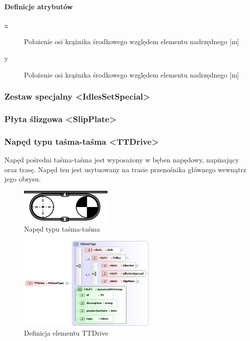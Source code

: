 \documentclass[12pt,a4paper]{article}
\begin{document}
\paragraph{Definicje atrybutów}
\begin{description}
\item[x] Położenie osi krążnika środkowego względem elementu nadrzędnego [m]
\item[y] Położenie osi krążnika środkowego względem elementu nadrzędnego [m]
\end{description}


\subsubsection{Zestaw specjalny <IdlesSetSpecial>}


\subsubsection{Płyta ślizgowa <SlipPlate>}


\subsubsection{Napęd typu taśma-taśma <TTDrive>}
Napęd pośredni taśma-taśma jest wyposażony w bęben napędowy, napinający oraz
trasę. Napęd ten jest usytuowany na trasie przenośnika głównego wewnątrz jego
obrysu.

\begin{figure}[H]
  \centering
  \includegraphics[width=0.4\textwidth]{png/naped_tt}
  \caption{Napęd typu taśma-taśma}
  \label{fig:ttDrive-drw}
\end{figure}

\begin{figure}[H]
  \centering
  \includegraphics[width=0.6\textwidth]{png/liquid/TTDrive}
  \caption{Definicja elementu TTDrive}
  \label{fig:ttDrive-xsd}
\end{figure}
\end{document}
